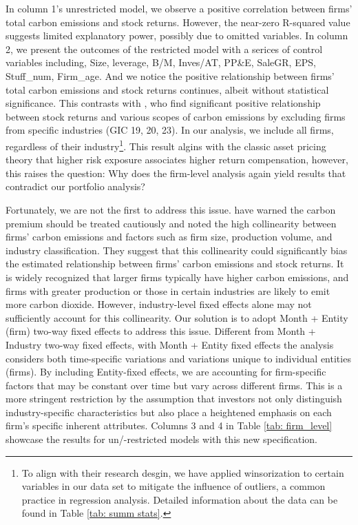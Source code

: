 \documentclass[12pt]{article}
\begin{document}
In column 1's unrestricted model, we observe a positive correlation between firms' total carbon emissions and stock returns. However, the near-zero R-squared value suggests limited explanatory power, possibly due to omitted variables. In column 2, we present the outcomes of the restricted model with a serices of control variables including, Size, leverage, B/M, Inves/AT, PP\&E, SaleGR, EPS, Stuff\_num, Firm\_age. And we notice the positive relationship between firms' total carbon emissions and stock returns continues, albeit without statistical significance. This contrasts with \citet{bolton2021investors}, who find significant positive relationship between stock returns and various scopes of carbon emissions by excluding firms from specific industries (GIC 19, 20, 23). In our analysis, we include all firms, regardless of their industry\footnote{To align with their research desgin, we have applied winsorization to certain variables in our data set to mitigate the influence of outliers, a common practice in regression analysis. Detailed information about the data can be found in Table \ref{tab: summ stats}.}. This result algins with the classic asset pricing theory that higher risk exposure associates higher return compensation, however, this raises the question: Why does the firm-level analysis again yield results that contradict our portfolio analysis?

Fortunately, we are not the first to address this issue. \citet{aswani2023carbon} have warned the carbon premium should be treated cautiously and noted the high collinearity between firms' carbon emissions and factors such as firm size, production volume, and industry classification. They suggest that this collinearity could significantly bias the estimated relationship between firms' carbon emissions and stock returns. It is widely recognized that larger firms typically have higher carbon emissions, and firms with greater production or those in certain industries are likely to emit more carbon dioxide. However, industry-level fixed effects alone may not sufficiently account for this collinearity. Our solution is to adopt Month + Entity (firm) two-way fixed effects to address this issue. Different from Month + Industry two-way fixed effects, with Month + Entity fixed effects the analysis considers both time-specific variations and variations unique to individual entities (firms). By including Entity-fixed effects, we are accounting for firm-specific factors that may be constant over time but vary across different firms. This is a more stringent restriction by the assumption that investors not only distinguish industry-specific characteristics but also place a heightened emphasis on each firm's specific inherent attributes. Columns 3 and 4 in Table \ref{tab: firm_level} showcase the results for un/-restricted models with this new specification.
\end{document}

